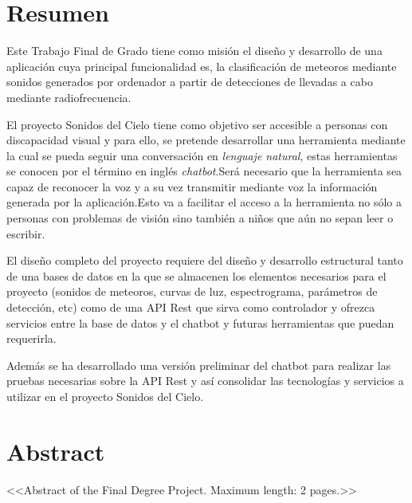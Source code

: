 \chapter*{Resumen}

Este Trabajo Final de Grado tiene como misión el diseño y desarrollo de una aplicación cuya principal funcionalidad es, la clasificación de  meteoros mediante sonidos generados por ordenador a partir de detecciones de llevadas a cabo mediante radiofrecuencia. 

El proyecto Sonidos del Cielo tiene como objetivo ser accesible a personas con discapacidad visual y para ello, se pretende desarrollar una herramienta mediante la cual se pueda seguir una conversación en \textit{lenguaje natural}, estas herramientas se conocen por el término en inglés \textit{chatbot}.Será necesario que la herramienta sea capaz de reconocer la voz y a su vez transmitir mediante voz la información generada por la aplicación.Esto va a facilitar el acceso a la herramienta no sólo a personas con problemas de visión sino también a niños que aún no sepan leer o escribir.

El diseño completo del proyecto requiere del diseño y desarrollo estructural tanto de una bases de datos en la que se almacenen los elementos necesarios para el proyecto (sonidos de meteoros, curvas de luz, espectrograma, parámetros de detección, etc) como de una API Rest que sirva como controlador y ofrezca servicios entre la base de datos y el chatbot y futuras herramientas que puedan requerirla.

Además se ha desarrollado una versión preliminar del chatbot para realizar las pruebas necesarias sobre la API Rest y así consolidar las tecnologías y servicios a utilizar en el proyecto Sonidos del Cielo.





\newpage

\chapter*{Abstract}

<<Abstract of the Final Degree Project. Maximum length: 2 pages.>>


